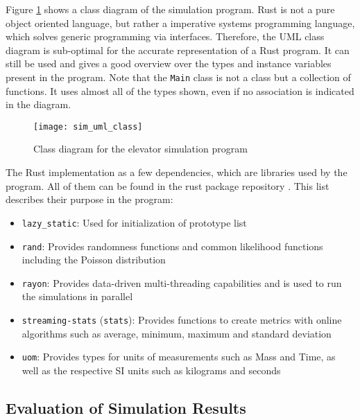 Figure \ref{fig:impl:simclass} shows a class diagram of the simulation program.
Rust is not a pure object oriented language, but rather a imperative systems programming language, which solves generic programming via interfaces.
Therefore, the \ac{UML} class diagram is sub-optimal for the accurate representation of a Rust program.
It can still be used and gives a good overview over the types and instance variables present in the program.
Note that the \texttt{Main} class is not a class but a collection of functions.
It uses almost all of the types shown, even if no association is indicated in the diagram.

\begin{figure}[p]
    \centering
    \texttt{[image: sim\_uml\_class]}
    \caption{Class diagram for the elevator simulation program}
    \label{fig:impl:simclass}
\end{figure}

The Rust implementation as a few dependencies, which are libraries used by the program.
All of them can be found in the rust package repository \autocite[][]{rust2018cratesio}.
This list describes their purpose in the program:
\begin{samepage}
\begin{itemize}[noitemsep]
    \item \texttt{lazy\_static}: Used for initialization of prototype list
    \item \texttt{rand}: Provides randomness functions and common likelihood functions including the Poisson distribution
    \item \texttt{rayon}: Provides data-driven multi-threading capabilities and is used to run the simulations in parallel
    \item \texttt{streaming-stats} (\texttt{stats}): Provides functions to create metrics with online algorithms such as average,  minimum, maximum and standard deviation
    \item \texttt{uom}: Provides types for units of measurements such as Mass and Time, as well as the respective \ac{SI} units such as kilograms and seconds
\end{itemize}
\end{samepage}

\subsection{Evaluation of Simulation Results}

